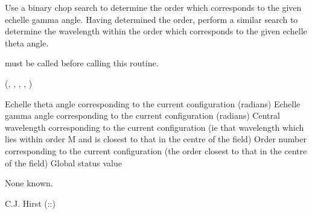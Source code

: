 \begin{manroutinedescription}
     Use a binary chop search to determine the order which corresponds to
     the given echelle gamma angle. Having determined the order, perform a
     similar search to determine the wavelength within the order which
     corresponds to the given echelle theta angle.

     {} must be called before calling this routine.

     {} {} ({}, {}, {%
}, {}, {})

\begin{manparametertable}
Echelle theta angle corresponding to the
                                      current configuration (radians)
Echelle gamma angle corresponding to the
                                      current configuration (radians)
Central wavelength corresponding to the
                                      current configuration (ie that wavelength
                                      which lies within order M and is closest
                                      to that in the centre of the field)
Order number corresponding to the current
                                      configuration (the order closest to that
                                      in the centre of the field)
 Global status value
\end{manparametertable}
     None known.

     C.J. Hirst  {}  ({}::{})

\end{manroutinedescription}
